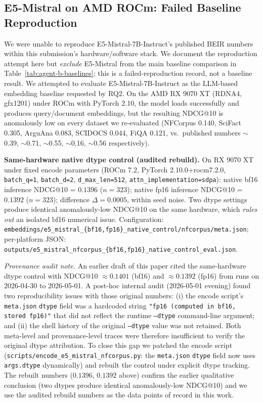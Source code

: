 \documentclass[review,1p]{elsarticle}
\begin{document}
\subsection{E5-Mistral on AMD ROCm: Failed Baseline Reproduction}
\label{subsec:e5-failed-reproduction}
\label{subsec:e5-disclosure}

We were unable to reproduce E5-Mistral-7B-Instruct's published BEIR numbers within this submission's hardware/software stack. We document the reproduction attempt here but \emph{exclude} E5-Mistral from the main baseline comparison in Table~\ref{tab:agent-b-baselines}; this is a failed-reproduction record, not a baseline result. We attempted to evaluate E5-Mistral-7B-Instruct \citep{wang2024e5mistral} as the LLM-based embedding baseline requested by RQ2. On the AMD RX 9070 XT (RDNA4, gfx1201) under ROCm with PyTorch 2.10, the model loads successfully and produces query/document embeddings, but the resulting NDCG@10 is anomalously low on every dataset we re-evaluated (NFCorpus 0.140, SciFact 0.305, ArguAna 0.083, SCIDOCS 0.044, FiQA 0.121, vs.\ published numbers $\sim$0.39, $\sim$0.71, $\sim$0.55, $\sim$0.16, $\sim$0.56 respectively).

\textbf{Same-hardware native dtype control (audited rebuild).} On RX 9070 XT under fixed encode parameters (ROCm 7.2, PyTorch 2.10.0+rocm7.2.0, \texttt{batch\_q=1}, \texttt{batch\_d=2}, \texttt{d\_max\_len=512}, \texttt{attn\_implementation=sdpa}): native bf16 inference NDCG@10 = $0.1396$ ($n=323$); native fp16 inference NDCG@10 = $0.1392$ ($n=323$); difference $\Delta = 0.0005$, within seed noise. Two dtype settings produce identical anomalously-low NDCG@10 on the same hardware, which \emph{rules out} an isolated bf16 numerical issue. Configuration: \texttt{embeddings/e5\_mistral\_\{bf16,fp16\}\_native\_control/nfcorpus/meta.json}; per-platform JSON: \texttt{outputs/e5\_mistral\_nfcorpus\_\{bf16,fp16\}\_native\_control\_eval.json}.

\textit{Provenance audit note.} An earlier draft of this paper cited the same-hardware dtype control with NDCG@10 $\approx 0.1401$ (bf16) and $\approx 0.1392$ (fp16) from runs on 2026-04-30 to 2026-05-01. A post-hoc internal audit (2026-05-01 evening) found two reproducibility issues with those original numbers: (i) the encode script's \texttt{meta.json} \texttt{dtype} field was a hardcoded string \texttt{"fp16 (computed in bf16, stored fp16)"} that did not reflect the runtime \texttt{--dtype} command-line argument; and (ii) the shell history of the original \texttt{--dtype} value was not retained. Both meta-level and provenance-level traces were therefore insufficient to verify the original dtype attribution. To close this gap we patched the encode script (\texttt{scripts/encode\_e5\_mistral\_nfcorpus.py}: the \texttt{meta.json} \texttt{dtype} field now uses \texttt{args.dtype} dynamically) and rebuilt the control under explicit dtype tracking. The rebuilt numbers ($0.1396$, $0.1392$ above) confirm the earlier qualitative conclusion (two dtypes produce identical anomalously-low NDCG@10) and we use the audited rebuild numbers as the data points of record in this work.
\end{document}
